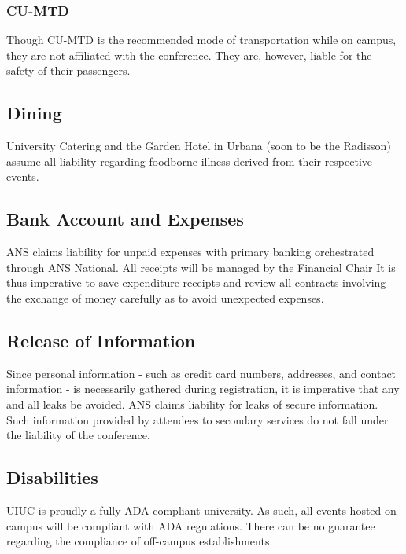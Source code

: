 \subsubsection{CU-MTD}
Though CU-MTD is the recommended mode of transportation while on campus, they are not affiliated with the conference. They are, however, liable for the safety of their passengers.

\subsection{Dining}
University Catering and the Garden Hotel in Urbana (soon to be the Radisson) assume all liability regarding foodborne illness derived from their respective events.

\subsection{Bank Account and Expenses}
ANS claims liability for unpaid expenses with primary banking orchestrated through ANS National. All receipts will be managed by the Financial Chair It is thus imperative to save expenditure receipts and review all contracts involving the exchange of money carefully as to avoid unexpected expenses. 

\subsection{Release of Information}
Since personal information - such as credit card numbers, addresses, and contact information - is necessarily gathered during registration, it is imperative that any and all leaks be avoided. ANS claims liability for leaks of secure information. Such information provided by attendees to secondary services do not fall under the liability of the conference.

\subsection{Disabilities}
UIUC is proudly a fully ADA compliant university. As such, all events hosted on campus will be compliant with ADA regulations. There can be no guarantee regarding the compliance of off-campus establishments.

